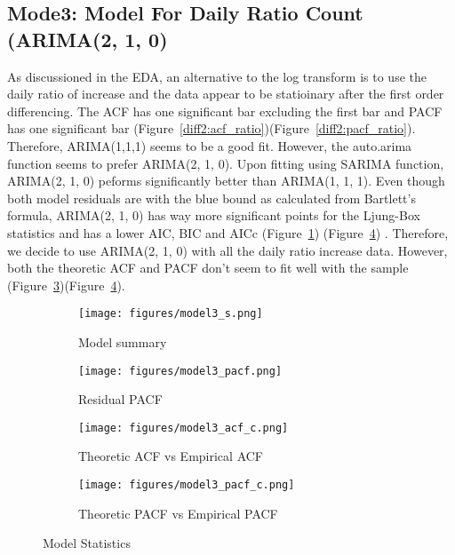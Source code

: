 \documentclass[a4paper]{article}
\begin{document}
\subsection{Mode3: Model For Daily Ratio Count (ARIMA(2, 1, 0)}
As discussioned in the EDA, an alternative to the log transform is to use the
daily ratio of increase and the data appear to be statioinary after the first
order differencing.  The ACF has one significant bar excluding the first bar and
PACF has one significant bar (Figure~\ref{diff2:acf_ratio})(Figure~\ref{diff2:pacf_ratio}). Therefore, ARIMA(1,1,1) seems to be a good fit. However, the auto.arima function seems to prefer ARIMA(2, 1, 0). Upon fitting using SARIMA function, ARIMA(2, 1, 0)  peforms significantly better than ARIMA(1, 1, 1). Even though both model residuals are with the blue bound as calculated from Bartlett's formula, ARIMA(2, 1, 0) has way more significant points for the Ljung-Box statistics  and has a lower AIC, BIC and AICc (Figure~\ref{model3:s}) (Figure~\ref{model3:pc}) . Therefore,
we decide to use ARIMA(2, 1, 0) with all the daily ratio increase data. However,
both the theoretic ACF and PACF don't seem to fit well with the
sample (Figure~\ref{model3:ac})(Figure~\ref{model3:pc}).


\begin{figure}[htpb]
\centering
\begin{subfigure}{.5\textwidth}
  \centering
  \texttt{[image: figures/model3\_s.png]}
  \caption{Model summary}
  \label{model3:s}
\end{subfigure}%
\begin{subfigure}{.5\textwidth}
  \centering
  \texttt{[image: figures/model3\_pacf.png]}
  \caption{Residual PACF}
  \label{model3:p}
\end{subfigure}

\begin{subfigure}{.5\textwidth}
	\centering
	\texttt{[image: figures/model3\_acf\_c.png]}
	\caption{Theoretic ACF vs Empirical ACF}
	\label{model3:ac}
\end{subfigure}%
\begin{subfigure}{.5\textwidth}
	\centering
	\texttt{[image: figures/model3\_pacf\_c.png]}
	\caption{Theoretic PACF vs Empirical PACF}
	\label{model3:pc}
\end{subfigure}

\caption{Model Statistics}
\label{model3}
\end{figure}
\end{document}
